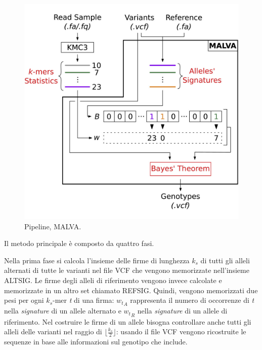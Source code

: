 \documentclass[../main.tex]{subfiles}
\begin{document}
 \begin{figure}[h!]
	\centering
  	\captionsetup{justification=centering}
  	\includegraphics[scale=.90]{images/malva-pipeline.jpg}
  	\caption{Pipeline, MALVA.}
  	\label{fig:malva}
\end{figure}

\noindent
Il metodo principale è composto da quattro fasi.

Nella prima fase si calcola l'insieme delle firme di lunghezza \textit{${k}_{s}$} di tutti gli alleli alternati di tutte le varianti nel file VCF che vengono memorizzate nell'insieme ALTSIG. Le firme degli alleli di riferimento vengono invece calcolate e memorizzate in un altro set chiamato REFSIG. Quindi, vengono memorizzati due pesi per ogni \textit{${k}_{s}$}-mer \textit{t} di una firma: \textit{${w_{t}}_{A}$} rappresenta il numero di occorrenze di \textit{t} nella \textit{signature} di un allele alternato e \textit{${w_{t}}_{R}$} nella \textit{signature} di un allele di riferimento. Nel costruire le firme di un allele bisogna controllare anche tutti gli alleli delle varianti nel raggio di $\lfloor \frac{ {{{k}_{s}} }}{2}  \rfloor$: usando il file VCF vengono ricostruite le sequenze in base alle informazioni sul genotipo che include. 
\end{document}
